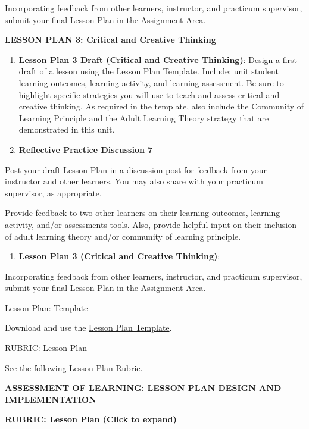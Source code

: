\documentclass[
]{book}
\providecommand{\tightlist}{%
  \setlength{\itemsep}{0pt}\setlength{\parskip}{0pt}}
\begin{document}
Incorporating feedback from other learners, instructor, and practicum supervisor, submit your final Lesson Plan in the Assignment Area.

\textbf{LESSON PLAN 3: Critical and Creative Thinking}

\begin{enumerate}
\def\labelenumi{\arabic{enumi}.}
\item
  \textbf{Lesson Plan 3 Draft (Critical and Creative Thinking)}: Design a first draft of a lesson using the Lesson Plan Template. Include: unit student learning outcomes, learning activity, and learning assessment. Be sure to highlight specific strategies you will use to teach and assess critical and creative thinking. As required in the template, also include the Community of Learning Principle and the Adult Learning Theory strategy that are demonstrated in this unit.
\item
  \textbf{Reflective Practice Discussion 7}
\end{enumerate}

Post your draft Lesson Plan in a discussion post for feedback from your instructor and other learners. You may also share with your practicum supervisor, as appropriate.

Provide feedback to two other learners on their learning outcomes, learning activity, and/or assessments tools. Also, provide helpful input on their inclusion of adult learning theory and/or community of learning principle.

\begin{enumerate}
\def\labelenumi{\arabic{enumi}.}
\setcounter{enumi}{2}
\tightlist
\item
  \textbf{Lesson Plan 3 (Critical and Creative Thinking)}:
\end{enumerate}

Incorporating feedback from other learners, instructor, and practicum supervisor, submit your final Lesson Plan in the Assignment Area.

{Lesson Plan: Template}

Download and use the \href{assets/u3/LDRS_667_Lesson_Plan_Template.docx}{Lesson Plan Template}.

{RUBRIC: Lesson Plan}

See the following \href{assets/u3/LDRS_667_Lesson_Plan_Rubric.pdf}{Lesson Plan Rubric}.

\textbf{ASSESSMENT OF LEARNING: LESSON PLAN DESIGN AND IMPLEMENTATION}

\textbf{RUBRIC: Lesson Plan (Click to expand)}
\end{document}
